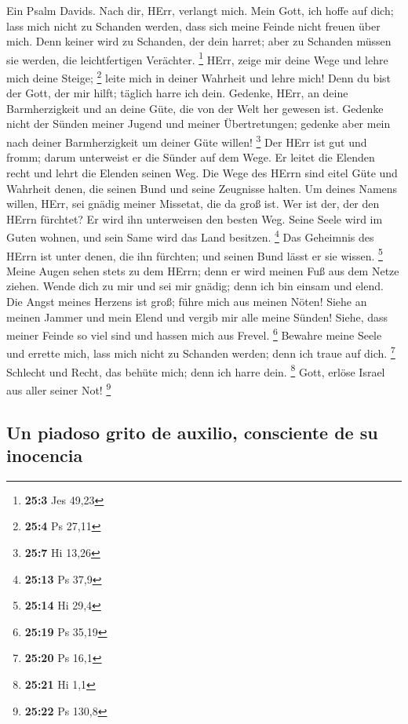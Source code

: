  Ein Psalm Davids. Nach dir, HErr, verlangt mich.
 Mein Gott, ich hoffe auf dich; lass mich nicht zu
Schanden werden, dass sich meine Feinde nicht freuen über mich.
 Denn keiner wird zu Schanden, der dein harret; aber zu
Schanden müssen sie werden, die leichtfertigen Verächter. \footnote{\textbf{25:3}
  Jes 49,23}  HErr, zeige mir deine Wege und lehre mich
deine Steige; \footnote{\textbf{25:4} Ps 27,11}  leite
mich in deiner Wahrheit und lehre mich! Denn du bist der Gott, der mir
hilft; täglich harre ich dein.  Gedenke, HErr, an deine
Barmherzigkeit und an deine Güte, die von der Welt her gewesen ist.
 Gedenke nicht der Sünden meiner Jugend und meiner
Übertretungen; gedenke aber mein nach deiner Barmherzigkeit um deiner
Güte willen! \footnote{\textbf{25:7} Hi 13,26}  Der HErr
ist gut und fromm; darum unterweist er die Sünder auf dem Wege.
 Er leitet die Elenden recht und lehrt die Elenden seinen
Weg.  Die Wege des HErrn sind eitel Güte und Wahrheit
denen, die seinen Bund und seine Zeugnisse halten.  Um
deines Namens willen, HErr, sei gnädig meiner Missetat, die da groß ist.
 Wer ist der, der den HErrn fürchtet? Er wird ihn
unterweisen den besten Weg.  Seine Seele wird im Guten
wohnen, und sein Same wird das Land besitzen. \footnote{\textbf{25:13}
  Ps 37,9}  Das Geheimnis des HErrn ist unter denen, die
ihn fürchten; und seinen Bund lässt er sie wissen. \footnote{\textbf{25:14}
  Hi 29,4}  Meine Augen sehen stets zu dem HErrn; denn er
wird meinen Fuß aus dem Netze ziehen.  Wende dich zu mir
und sei mir gnädig; denn ich bin einsam und elend.  Die
Angst meines Herzens ist groß; führe mich aus meinen Nöten!
 Siehe an meinen Jammer und mein Elend und vergib mir
alle meine Sünden!  Siehe, dass meiner Feinde so viel
sind und hassen mich aus Frevel. \footnote{\textbf{25:19} Ps 35,19}
 Bewahre meine Seele und errette mich, lass mich nicht zu
Schanden werden; denn ich traue auf dich. \footnote{\textbf{25:20} Ps
  16,1}  Schlecht und Recht, das behüte mich; denn ich
harre dein. \footnote{\textbf{25:21} Hi 1,1}  Gott,
erlöse Israel aus aller seiner Not! \footnote{\textbf{25:22} Ps 130,8}

\hypertarget{un-piadoso-grito-de-auxilio-consciente-de-su-inocencia}{%
\subsection{Un piadoso grito de auxilio, consciente de su
inocencia}\label{un-piadoso-grito-de-auxilio-consciente-de-su-inocencia}}

